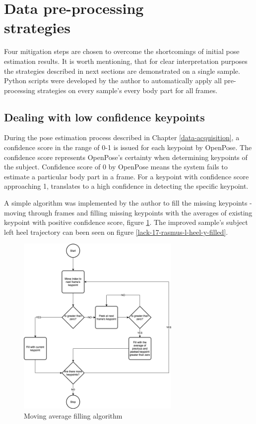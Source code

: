\section{Data pre-processing\\strategies}
\label{data-pre-processing-strategies}

Four mitigation steps are chosen to overcome the shortcomings of initial pose estimation results. It is worth mentioning, that for clear interpretation purposes the strategies described in next sections are demonstrated on a single sample. Python scripts were developed by the author to automatically apply all pre-processing strategies on every sample's every body part for all frames.

\subsection{Dealing with low confidence keypoints}

During the pose estimation process described in Chapter \ref{data-acquisition}, a confidence score in the range of 0-1 is issued for each keypoint by OpenPose. The confidence score represents OpenPose's certainty when determining keypoints of the subject. Confidence score of 0 by OpenPose means the system fails to estimate a particular body part in a frame. For a keypoint with confidence score approaching 1, translates to a high confidence in detecting the specific keypoint. 

A simple algorithm was implemented by the author to fill the missing keypoints - moving through frames and filling missing keypoints with the averages of existing keypoint with positive confidence score, figure \ref{moving-average-filling-algorithm}. The improved sample's subject left heel trajectory can been seen on figure \ref{lack-17-rasmus-l-heel-y-filled}.

\begin{figure}[htb]
  \centering
    \includegraphics[width=0.7\textwidth,keepaspectratio]
    {images/data-preprocessing/moving-average-filling-algorithm}
    \caption{Moving average filling algorithm}
    \label{moving-average-filling-algorithm}
\end{figure}

